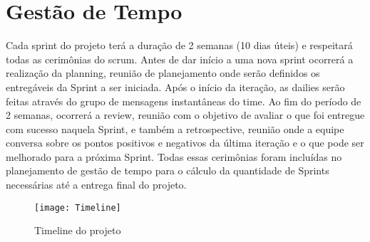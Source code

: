 \section{Gestão de Tempo}
Cada \gls{sprint} do projeto terá a duração de 2 semanas (10 dias úteis) e respeitará
todas as cerimônias do \gls{scrum}. Antes de dar início a uma nova sprint
ocorrerá a realização da \gls{planning}, reunião de planejamento onde
serão definidos os entregáveis da Sprint a ser iniciada. Após o início
da iteração, as dailies serão feitas através do grupo de mensagens
instantâneas do time. Ao fim do período de 2 semanas, ocorrerá a
\gls{review}, reunião com o objetivo de avaliar o que foi entregue
com sucesso naquela Sprint, e também a \gls{retrospective}, reunião
onde a equipe conversa sobre os pontos positivos e negativos da última
iteração e o que pode ser melhorado para a próxima Sprint. Todas essas
cerimônias foram incluídas no planejamento de gestão de tempo para o
cálculo da quantidade de Sprints necessárias até a entrega final do
projeto.

\begin{figure}[H]
  \centering
  \caption{Timeline do projeto}
  \label{fig:timelineProjeto}
  \texttt{[image: Timeline]}
\end{figure}

